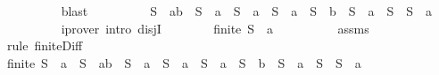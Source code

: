\begin{isabellebody}
\ \ \ \ \ \ \ \ \isamarkupfalse%
\ blast\isanewline
\ \ \ \ \ \ \isamarkupfalse%
\ \isamarkupfalse%
\ {}{\isacharcolon}{\isachardoublequoteopen}S\ {\isacharequal}\ {\isacharbraceleft}a{\isacharcomma}b{\isacharbraceright}\ {\isasymunion}\ {\isacharparenleft}S\ {\isacharminus}\ {\isacharbraceleft}a{\isacharbraceright}{\isacharparenright}\ {\isasymor}\ S\ {\isacharequal}\ {\isacharbraceleft}a{\isacharbraceright}\ {\isasymunion}\ {\isacharparenleft}S\ {\isacharminus}\ {\isacharbraceleft}a{\isacharbraceright}{\isacharparenright}\ {\isasymor}\ S\ {\isacharequal}\ {\isacharbraceleft}b{\isacharbraceright}\ {\isasymunion}\ {\isacharparenleft}S\ {\isacharminus}\ {\isacharbraceleft}a{\isacharbraceright}{\isacharparenright}\ {\isasymor}\ S\ {\isacharequal}\ {\isacharparenleft}S\ {\isacharminus}\ {\isacharbraceleft}a{\isacharbraceright}{\isacharparenright}{\isachardoublequoteclose}\isanewline
\ \ \ \ \ \ \ \ \isamarkupfalse%
\ {\isacharparenleft}iprover\ intro{\isacharcolon}\ disjI{}{\isacharparenright}\isanewline
\ \ \ \ \ \ \isamarkupfalse%
\ {\isachardoublequoteopen}finite\ {\isacharparenleft}S\ {\isacharminus}\ {\isacharbraceleft}a{\isacharbraceright}{\isacharparenright}{\isachardoublequoteclose}\isanewline
\ \ \ \ \ \ \ \ \isamarkupfalse%
\ assms{\isacharparenleft}{}{\isacharparenright}\ \isamarkupfalse%
\ {\isacharparenleft}rule\ finite{\isacharunderscore}Diff{\isacharparenright}\isanewline
\ \ \ \ \ \ \isamarkupfalse%
\ \isamarkupfalse%
\ {\isachardoublequoteopen}finite\ {\isacharparenleft}S\ {\isacharminus}\ {\isacharbraceleft}a{\isacharbraceright}{\isacharparenright}\ {\isasymand}\ {\isacharparenleft}S\ {\isacharequal}\ {\isacharbraceleft}a{\isacharcomma}b{\isacharbraceright}\ {\isasymunion}\ {\isacharparenleft}S\ {\isacharminus}\ {\isacharbraceleft}a{\isacharbraceright}{\isacharparenright}\ {\isasymor}\ S\ {\isacharequal}\ {\isacharbraceleft}a{\isacharbraceright}\ {\isasymunion}\ {\isacharparenleft}S\ {\isacharminus}\ {\isacharbraceleft}a{\isacharbraceright}{\isacharparenright}\ {\isasymor}\ S\ {\isacharequal}\ {\isacharbraceleft}b{\isacharbraceright}\ {\isasymunion}\ {\isacharparenleft}S\ {\isacharminus}\ {\isacharbraceleft}a{\isacharbraceright}{\isacharparenright}\ {\isasymor}\ S\ {\isacharequal}\ {\isacharparenleft}S\ {\isacharminus}\ {\isacharbraceleft}a{\isacharbraceright}{\isacharparenright}{\isacharparenright}{\isachardoublequoteclose}\isanewline
\ \ \ \ \ \ \ \ \isamarkupfalse%

\end{isabellebody}
